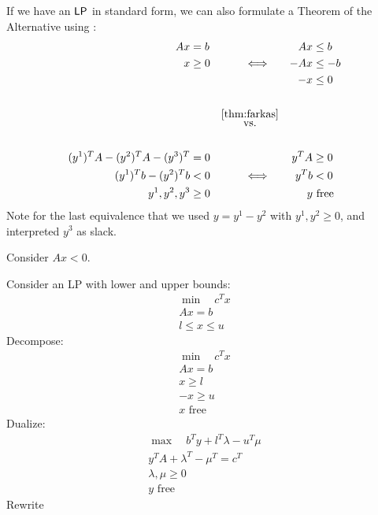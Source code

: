 \begin{remark}
    If we have an $\mathsf{LP}$ in standard form, we can also formulate a Theorem of the Alternative using :
    \begin{alignat*}{3}
        Ax                            & = b    &                                        &  & Ax   & \leq b       \\
        x                             & \geq 0 & \quad \Longleftrightarrow \quad        &  & -Ax  & \leq -b      \\
                                      &        &                                        &  & -x   & \leq 0       \\\\
                                      &        & \overset{\ref{thm:farkas}}{\text{vs.}}                          \\\\
        (y^1)^TA - (y^2)^TA - (y^3)^T & = 0    &                                        &  & y^TA & \geq 0       \\
        (y^1)^Tb - (y^2)^Tb           & <0     & \quad \Longleftrightarrow \quad        &  & y^Tb & < 0          \\
        y^1,y^2,y^3                   & \geq 0 &                                        &  & y    & \text{ free} \\
    \end{alignat*}
    Note for the last equivalence that we used $y = y^1 - y^2$ with $y^1,y^2 \geq 0$, and interpreted $y^3$ as slack.
\end{remark}
\begin{theorem}[Gourdan]
    Consider $Ax < 0$.
\end{theorem}
Consider an LP with lower and upper bounds:
\begin{align*}
    \min \quad c^Tx \\
    Ax=b            \\
    l \leq x \leq u
\end{align*}
Decompose:
\begin{align*}
    \min \quad c^Tx \\
    Ax=b            \\
    x \geq l        \\
    -x \geq u       \\
    x \text{ free}
\end{align*}
Dualize:
\begin{align*}
    \max \quad b^Ty + l^T\lambda - u^T \mu \\
    y^TA + \lambda^T - \mu^T = c^T         \\
    \lambda,\mu \geq 0                     \\
    y \text{ free}
\end{align*}
Rewrite